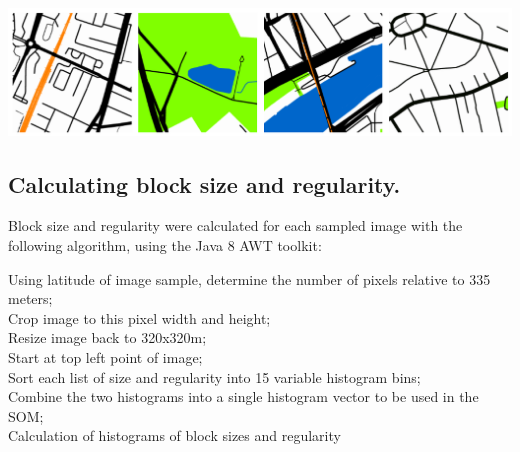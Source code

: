 \documentclass{nature}
\makeatletter
\renewenvironment*{figure}{\@float{figure}}{\end@float}
\makeatother
\begin{document}
\begin{methods}
\begin{figure}
    \centering    
 \includegraphics[scale=0.8]{Images/SampleTraining.png}   
\caption{\bf Four sample Google Maps training data images (from Paris, France)\cite{GoogleStatic2017}.}    
 \label{fig:maps}  
\end{figure} 


\subsection{Calculating block size and regularity.}\label{methodscalc}

Block size and regularity were calculated for each sampled image with the following algorithm, using the Java 8 AWT toolkit\cite{Oracle2018}:

\begin{algorithm}[H]
\SetAlgoLined
{}
 Using latitude of image sample, determine the number of pixels relative to 335 meters;\\
 Crop image to this pixel width and height;\\
 Resize image back to 320x320m;\\
 Start at top left point of image;\\
 Sort each list of size and regularity into 15 variable histogram bins;\\
 Combine the two histograms into a single histogram vector to be used in the SOM;\\
 \caption{Calculation of histograms of block sizes and regularity}
\end{algorithm}


\end{methods}
\end{document}
